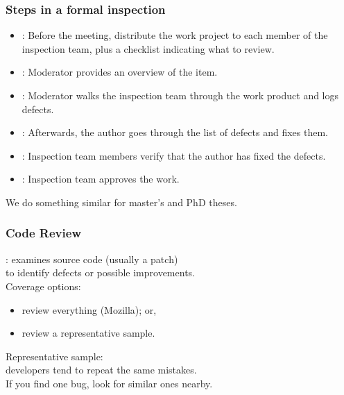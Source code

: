 \begin{frame}
\frametitle{Steps in a formal inspection}

\begin{changemargin}{1cm}
\begin{itemize}
\item {}: Before the meeting, distribute the work project to each member of the inspection team, 
plus a checklist indicating what to review.\\[0.5em]
\item {}: Moderator
provides an overview of the item.\\[0.5em]
\item {}: Moderator walks the inspection team
through the work product and logs defects.\\[0.5em]
\item {}: Afterwards, the author
goes through the list of defects and fixes them.\\[0.5em]
\item {}: Inspection team members verify that
the author has fixed the defects.\\[0.5em]
\item {}: Inspection team approves the work.\\[0.5em]
\end{itemize}
We do something similar for master's and PhD theses.
\end{changemargin}

\end{frame}

\begin{frame}
\frametitle{Code Review}

\begin{changemargin}{1cm}

: examines source code (usually a patch)\\
to identify defects or possible improvements.\\[1em]

Coverage options:
\begin{itemize}
\item review everything (Mozilla); or,
\item review a representative sample.
\end{itemize}

Representative sample: \\ \qquad developers tend to repeat the same mistakes.\\
If you find one bug, look for similar ones nearby.
\end{changemargin}
\end{frame}

